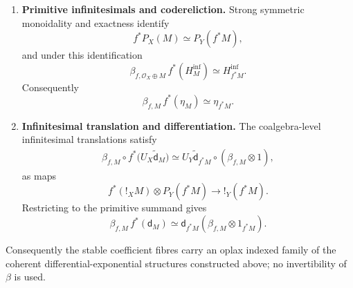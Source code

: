 \begin{proposition}
\begin{enumerate}[label=(\roman*)]
    \item \textbf{Primitive infinitesimals and codereliction.}
    Strong symmetric monoidality and exactness identify
    \[
        f^*P_X(M)\simeq P_Y(f^*M),
    \]
    and under this identification
    \[
        \beta_{f,\mathcal O_X\oplus M}\,f^*(H^{\inf}_M)
        \simeq
        H^{\inf}_{f^*M}.
    \]
    Consequently
    \[
        \beta_{f,M}\,f^*(\eta_M)
        \simeq
        \eta_{f^*M}.
    \]

    \item \textbf{Infinitesimal translation and differentiation.}
    The coalgebra-level infinitesimal translations satisfy
    \[
    \begin{aligned}
        \beta_{f,M}\circ f^*\bigl(U_X\widetilde{\mathsf d}_M\bigr)
        \simeq
        U_Y\widetilde{\mathsf d}_{f^*M}
        \circ
        (\beta_{f,M}\otimes1),
    \end{aligned}
    \]
    as maps
    \[
        f^*(!_XM)\otimes P_Y(f^*M)
        \longrightarrow
        !_Y(f^*M).
    \]
    Restricting to the primitive summand gives
    \[
        \beta_{f,M}\,f^*(\mathsf d_M)
        \simeq
        \mathsf d_{f^*M}(\beta_{f,M}\otimes1_{f^*M}).
    \]
\end{enumerate}
Consequently the stable coefficient fibres carry an oplax indexed family of the
coherent differential-exponential structures constructed above; no
invertibility of \(\beta\) is used.
\end{proposition}

